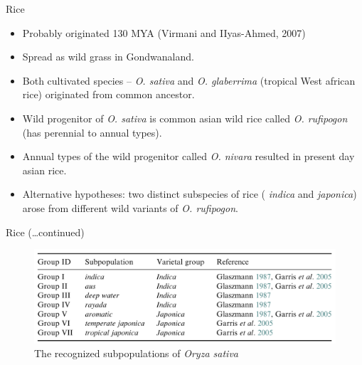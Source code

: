 \documentclass[ignorenonframetext,aspectratio=169]{beamer}
\providecommand{\tightlist}{%
  \setlength{\itemsep}{0pt}\setlength{\parskip}{0pt}}
\begin{document}
\begin{frame}{Rice}
\protect\hypertarget{rice}{}

\begin{itemize}
\tightlist
\item
  Probably originated 130 MYA (Virmani and IIyas-Ahmed, 2007)
\item
  Spread as wild grass in Gondwanaland.
\item
  Both cultivated species -- \emph{O. sativa} and \emph{O. glaberrima}
  (tropical West african rice) originated from common ancestor.
\item
  Wild progenitor of \emph{O. sativa} is common asian wild rice called
  \emph{O. rufipogon} (has perennial to annual types).
\item
  Annual types of the wild progenitor called \emph{O. nivara} resulted
  in present day asian rice.
\item
  Alternative hypotheses: two distinct subspecies of rice (
  \emph{indica} and \emph{japonica}) arose from different wild variants
  of \emph{O. rufipogon}.
\end{itemize}

\end{frame}

\begin{frame}{Rice (\ldots{}continued)}
\protect\hypertarget{rice-continued}{}

\begin{figure}
\includegraphics[width=0.45\linewidth]{./../images/rice_subpopulations} \caption{The recognized subpopulations of \textit{Oryza sativa}}\label{fig:subpopulations-rice}
\end{figure}

\end{frame}
\end{document}
